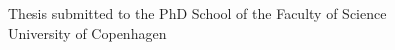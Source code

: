 \thispagestyle{empty}
\begin{center}
	\spacedlowsmallcaps{\myName} \\ \medskip

    \vfill{}
	\begingroup
		\color{CTtitle}\spacedallcaps{\myTitle}\\
	\endgroup
    \spacedlowsmallcaps{\mySubtitle}
    \vfill{}
    Thesis submitted to the PhD School of the Faculty of Science\\
    University of Copenhagen
\end{center}
